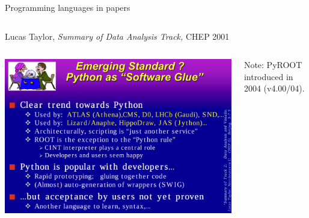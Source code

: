 \documentclass[aspectratio=169]{beamer}
\begin{document}
\begin{frame}{Programming languages in  papers}
\vspace{0.35 cm}

\begin{columns}
\end{columns}
\end{frame}

\begin{frame}{Lucas Taylor, {\it Summary of Data Analysis Track,} CHEP 2001}
\vspace{0.25 cm}
\begin{columns}

\includegraphics[width=\linewidth]{chep-2001-python.png}

Note: PyROOT introduced in 2004 (v4.00/04).
\end{columns}
\end{frame}
\end{document}
